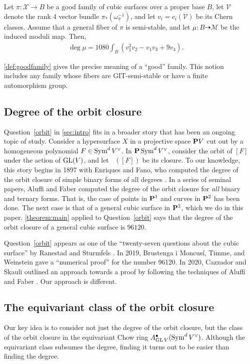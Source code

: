 \documentclass[12pt,reqno]{amsart}
\DeclareMathOperator{\Orb}{\overline{Orb}}
\renewcommand{\to}{{\longrightarrow}}
\numberwithin{equation}{section}
\newcommand{\V}{\mathcal V}
\newcommand{\cX}{\mathcal{X}}
\begin{document}
\begin{theorem}\label{theorem:main}
  Let $\pi \colon \cX \to B$ be a good family of cubic surfaces over a
  proper base $B$, let $\V$ denote the rank 4 vector bundle
  $ \pi_* \left(\omega_\pi^{-1}\right)$, and let
  \(v_i = c_i\left(\V\right)\) be its Chern classes.  Assume that a
  general fiber of $\pi$ is semi-stable, and let
  $\mu \colon B \dashrightarrow \mathcal M$ be the induced moduli map.  Then,
  \begin{align}
    \deg \mu =
    \label{eq:MAIN}
    1080 \int_{B} \left(v_{1}^{2}v_{2} - v_{1}v_{3}+ 9v_{4}\right).
  \end{align}
\end{theorem}
\autoref{def:goodfamily} gives the precise meaning of a ``good''
family.  This notion includes any family whose fibers are
GIT-semi-stable or have a finite automorphism group.

\subsection{Degree of the orbit closure}
Question~\ref{orbit} in \autoref{sec:intro} fits in a broader story
that has been an ongoing topic of study.  Consider a hypersurface
\(X\) in a projective space $\P V$ cut out by a homogeneous polynomial
$F \in \Sym^d V^\vee$.  In $\P\Sym^dV^\vee$, consider the orbit of
$[F]$ under the action of $\GL(V)$, and let $\Orb([F])$ be its
closure.  To our knowledge, this story begins in 1897 with Enriques
and Fano, who computed the degree of the orbit closure of simple
binary forms of all degrees \cite{enriques.fano:97}.  In a series of
seminal papers, Aluffi and Faber computed the degree of the orbit
closure for \emph{all} binary and ternary forms.  That is, the case of
points in $\P^1$ and curves in $\P^2$ has been done.  The next case is
that of a general cubic surface in $\P^3$, which we do in this paper.
\autoref{theorem:main} applied to Question~\ref{orbit} says that the
degree of the orbit closure of a general cubic surface is $96120$.

Question~\ref{orbit} appears as one of the ``twenty-seven questions
about the cubic surface'' by Ranestad and Sturmfels \cite{ran.stu:20}.
In 2019, Brustenga i Moncus\'i, Timme, and Weinstein gave a
``numerical proof'' for the number 96120. In 2020, Cazzador and
Skauli outlined an approach towards a proof by following the
techniques of Aluffi and Faber \cite{bru-i-mon.tim.wei:20,caz.ska:20}.
Our approach is different.

\subsection{The equivariant class of the orbit closure}
Our key idea is to consider not just the degree of the orbit closure,
but the class of the orbit closure in the equivariant Chow ring
$A^\bullet_{\GL V}(\Sym^dV^\vee)$. Although the equivariant class subsumes the
degree, finding it turns out to be easier than finding the degree.
\end{document}

